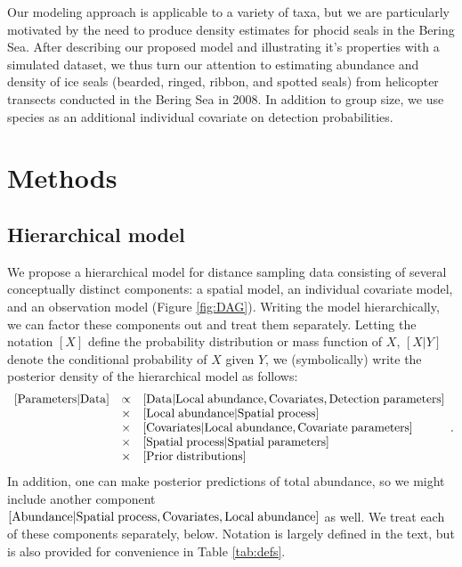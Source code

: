 \documentclass[10pt]{article}
\begin{document}
Our modeling approach is applicable to a variety of taxa, but we are particularly motivated by the need to produce density estimates for phocid seals in the Bering Sea.  After describing our proposed model and illustrating it's properties with a simulated dataset, we thus turn our attention to estimating abundance and density of ice seals (bearded, ringed, ribbon, and spotted seals) from helicopter transects conducted in the Bering Sea in 2008.  In addition to group size, we use species as an additional individual covariate on detection probabilities.


\section*{Methods}

\subsection*{Hierarchical model}

We propose a hierarchical model for distance sampling data consisting of several conceptually distinct components: a spatial model, an individual covariate model, and an observation model (Figure \ref{fig:DAG}).  Writing the model hierarchically, we can factor these components out
and treat them separately.  Letting the notation $[X]$ define the probability distribution or mass function of $X$, $[X|Y]$ denote the conditional probability of $X$ given $Y$, we (symbolically) write the posterior density of the hierarchical model as follows:
$$
\begin{array}{lll}
[ {\rm Parameters} | {\rm Data}] & \propto & [{\rm Data | Local \hspace{1mm} abundance, Covariates, Detection \hspace{1mm} parameters}]\\
& \times & [{\rm Local \hspace{1mm} abundance | Spatial \hspace{1mm} process}]\\
& \times & [{\rm Covariates|Local \hspace{1mm} abundance, Covariate \hspace{1mm} parameters}]\\
& \times & [{\rm Spatial \hspace{1mm} process | Spatial\hspace{1mm}  parameters}]\\
& \times & [{\rm Prior \hspace{1mm} distributions}]
\end{array}.
$$
In addition, one can make posterior predictions of total abundance, so we might include another component
$[{\rm Abundance |Spatial \hspace{1mm} process,Covariates,Local \hspace{1mm} abundance }]$ as well.
We treat each of these components separately, below.  Notation is largely defined in the text, but is also provided for convenience in Table \ref{tab:defs}.
\end{document}
